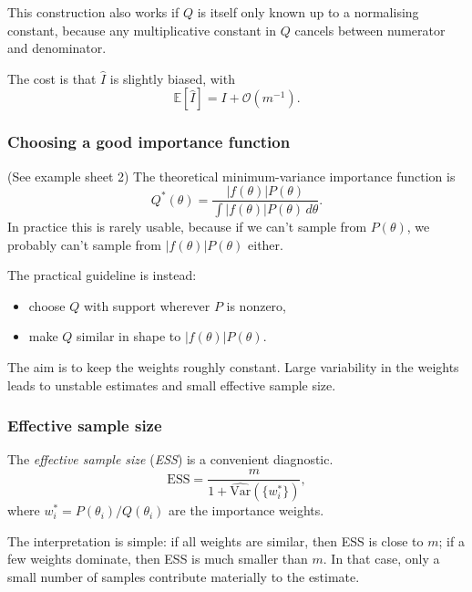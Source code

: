 \documentclass[11pt, titlepage]{article} %
\numberwithin{equation}{section}
\theoremstyle{definition}
\numberwithin{assumption}{section}
\begin{document}
This construction also works if $Q$ is itself only known up to a normalising constant, because any multiplicative constant in $Q$ cancels between numerator and denominator.

The cost is that $\hat I$ is slightly biased, with
\begin{equation*}
    \mathbb{E}[\hat I]=I+\mathcal{O}(m^{-1}).
\end{equation*}


\subsubsection*{Choosing a good importance function}

(See example sheet 2) The theoretical minimum-variance importance function is 
\begin{equation*}
    Q^*(\theta)
    =
    \frac{|f(\theta)|P(\theta)}
    {\int |f(\theta)|P(\theta)\,d\theta}.
\end{equation*}
In practice this is rarely usable, because if we can't sample from $P(\theta)$, we probably can't sample from $|f(\theta)|P(\theta)$ either.


The practical guideline is instead:
\begin{itemize}
    \item choose $Q$ with support wherever $P$ is nonzero,
    \item make $Q$ similar in shape to $|f(\theta)|P(\theta)$.
\end{itemize}
The aim is to keep the weights roughly constant. Large variability in the weights leads to unstable estimates and small effective sample size.


\subsubsection*{Effective sample size}

The \textit{effective sample size} (\textit{ESS}) is a convenient diagnostic. 
\begin{equation*}
    \mathrm{ESS}
    =
    \frac{m}{1+\widehat{\mathrm{Var}}\!\left(\{w_i^*\}\right)},
\end{equation*}
where $w_i^*=P(\theta_i)/Q(\theta_i)$ are the importance weights.

The interpretation is simple: if all weights are similar, then ESS is close to $m$; if a few weights dominate, then ESS is much smaller than $m$. In that case, only a small number of samples contribute materially to the estimate.
\end{document}
